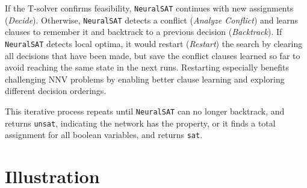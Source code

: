 \documentclass[oneside,11pt,dvipsnames]{book}
\numberwithin{equation}{section}
\theoremstyle{definition}
\theoremstyle{remark}
\newcommand{\neuralsat}{\texttt{NeuralSAT}}
\newcommand{\sat}{\texttt{sat}}
\newcommand{\unsat}{\texttt{unsat}}
\begin{document}
If the T-solver confirms feasibility, \neuralsat{} continues with new assignments (\emph{Decide}). Otherwise, \neuralsat{} detects a conflict   (\emph{Analyze Conflict}) and learns clauses to remember it and backtrack to a previous decision  (\emph{Backtrack}).
If \neuralsat{} detects local optima, it would restart (\emph{Restart}) the search by clearing all decisions that have been made, but save the conflict clauses learned so far to avoid reaching the same state in the next runs.
Restarting especially benefits challenging NNV problems by enabling better clause learning and exploring different decision orderings.

This iterative process repeats until \neuralsat{} can no longer backtrack, and returns \unsat{}, indicating the network has the property, or it finds a total assignment for all boolean variables, and returns \sat{}. %


\section{Illustration}
\end{document}
